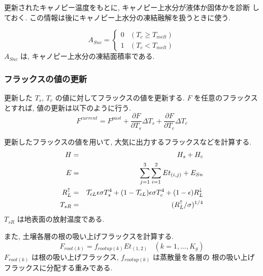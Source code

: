   更新されたキャノピー温度をもとに, キャノピー上水分が液体か固体かを診断
  しておく. この情報は後にキャノピー上水分の凍結融解を扱うときに使う.

\begin{equation}
 A_{Snc} = \left\{
\begin{array}{ll}
 0& (T_c \geq T_{melt})\\
 1& (T_c <    T_{melt})
\end{array}
\right.
\end{equation}
$A_{Snc}$ は, キャノピー上水分の凍結面積率である.

\subsubsection{フラックスの値の更新}

更新した $T_s$, $T_c$ の値に対してフラックスの値を更新する.
$F$ を任意のフラックスとすれば, 値の更新は以下のように行う.
\begin{equation}
 F^{current} = F^{past} + \frac{\partial F}{\partial T_s} \Delta T_s
                        + \frac{\partial F}{\partial T_c} \Delta T_c
\end{equation}

更新したフラックスの値を用いて, 大気に出力するフラックスなどを計算する.
\begin{eqnarray}
 H &=& H_s + H_c \\
 E &=& \sum_{j=1}^3 \sum_{i=1}^2 Et_{(i,j)} + E_{Sn} \\
 R^{\uparrow}_L &=& {\cal{T}}_{cL} \epsilon \sigma T_s^4
 + (1 - {\cal{T}}_{cL}) \epsilon \sigma T_c^4
 + (1 - \epsilon) R^{\downarrow}_L \\
 T_{sR} &=& ( R^{\uparrow}_L / \sigma )^{1/4}
\end{eqnarray}
$T_{sR}$ は地表面の放射温度である.

また, 土壌各層の根の吸い上げフラックスを計算する.
\begin{equation}
 F_{root(k)} = f_{rootup(k)} Et_{(1,2)} \ \ \ \ (k=1,\ldots,K_g)
\end{equation}
$F_{root(k)}$ は根の吸い上げフラックス, $f_{rootup(k)}$ は蒸散量を各層の
根の吸い上げフラックスに分配する重みである.
